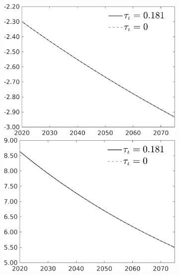 \begin{figure}[h!!]
\begin{subfigure}{0.9\textwidth}
\begin{minipage}[]{0.32\textwidth}
\end{minipage}
\begin{minipage}[]{0.32\textwidth}
	\includegraphics[width=1\textwidth]{../../codding_model/own_basedOnFried/optimalPol_010922_revision/figures/all_13Sept22/PerdifNoTauf_regime0_CompTaul_EY_spillover0_nsk0_xgr0_knspil1_sep0_LFlimit0_emsbase0_countec0_GovRev0_etaa0.79_lgd1.png}
\end{minipage}
\begin{minipage}[]{0.32\textwidth}
\includegraphics[width=1\textwidth]{../../codding_model/own_basedOnFried/optimalPol_010922_revision/figures/all_13Sept22/PerdifNoTauf_regime0_CompTaul_snS_spillover0_nsk0_xgr0_knspil1_sep0_LFlimit0_emsbase0_countec0_GovRev0_etaa0.79_lgd1.png}

\end{minipage}
\end{subfigure}
\end{figure}
